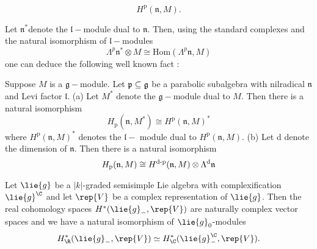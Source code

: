 \begin{equation*}
H^{\text{p}}(\mathfrak{n},M).
\end{equation*}

\noindent Let $\mathfrak{n}^{\ast }$denote the $\mathfrak{l}-$module dual to
$\mathfrak{n}$. Then, using the standard complexes and the natural
isomorphism of $\mathfrak{l}-$modules
\begin{equation*}
\Lambda ^{p}\mathfrak{n}^{\ast }\otimes M\cong \text{Hom}(\Lambda ^{p}%
\mathfrak{n},M)
\end{equation*}%
one can deduce the following well known fact \cite[Section 2]{HS}:

\begin{proposition}
Suppose $M$ is a $\mathfrak{g-}$module. Let $\mathfrak{p}\subseteq \mathfrak{%
g}$ be a parabolic subalgebra with nilradical $\mathfrak{n}$ and Levi factor
$\mathfrak{l}$. \newline
(a) Let $M^{\ast }$ denote the $\mathfrak{g}-$module dual to $M.$ Then there
is a natural isomorphism
\begin{equation*}
H_{\text{p}}(\mathfrak{n},M^{\ast })\cong H^{\text{p}}(\mathfrak{n},M)^{\ast
}
\end{equation*}%
where $H^{\text{p}}(\mathfrak{n},M)^{\ast }$ denotes the $\mathfrak{l-}$%
module dual to $H^{\text{p}}(\mathfrak{n},M)$.\newline
(b) Let d denote the dimension of $\mathfrak{n}$. Then there is a natural
isomorphism
\begin{equation*}
H_{\text{p}}(\mathfrak{n},M)\cong H^{\text{d-p}}(\mathfrak{n},M)\otimes
\Lambda ^{\text{d}}\mathfrak{n}\newline
\end{equation*}
\end{proposition}




\begin{proposition}
 Let $\lie{g}$ be a $|k|$-graded semisimple Lie algebra with complexification $\lie{g}^\C$ and let $\rep{V}$ be a complex representation of $\lie{g}$. Then the real cohomology spaces $H^*(\lie{g}_-,\rep{V})$ are 	naturally complex vector spaces and we have a natural isomorphism of $\lie{g}_0$-modules
 \[
  H_\R^*(\lie{g}_-,\rep{V}) \simeq H_\C^*(\lie{g}_-^\C,\rep{V}).
 \]

\end{proposition}



